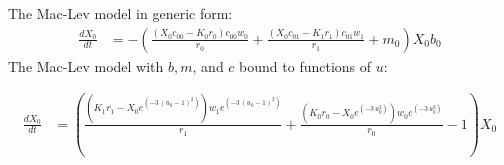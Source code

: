 \documentclass{article}
\begin{document}
The Mac-Lev model in generic form: 
\[\begin{align*}
\frac{dX_{0}}{dt} &= -{\left(\frac{{\left(X_{0} c_{00} - K_{0} r_{0}\right)} c_{00} w_{0}}{r_{0}} + \frac{{\left(X_{0} c_{01} - K_{1} r_{1}\right)} c_{01} w_{1}}{r_{1}} + m_{0}\right)} X_{0} b_{0}
\end{align*}\]
The Mac-Lev model with $b, m$, and $c$ bound to functions of $u$:

\[\begin{align*}
\frac{dX_{0}}{dt} &= {\left(\frac{{\left(K_{1} r_{1} - X_{0} e^{\left(-3 \, {\left(u_{0} - 1\right)}^{2}\right)}\right)} w_{1} e^{\left(-3 \, {\left(u_{0} - 1\right)}^{2}\right)}}{r_{1}} + \frac{{\left(K_{0} r_{0} - X_{0} e^{\left(-3 \, u_{0}^{2}\right)}\right)} w_{0} e^{\left(-3 \, u_{0}^{2}\right)}}{r_{0}} - 1\right)} X_{0}
\end{align*}\]
\end{document}
